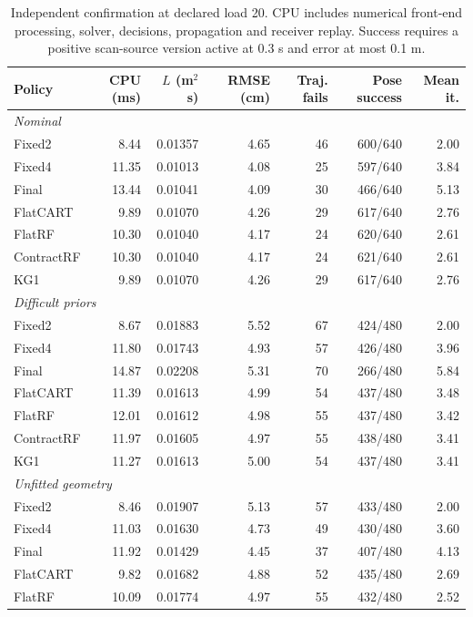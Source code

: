 \begin{table}[!htbp]\centering\footnotesize
\caption{Independent confirmation at declared load 20. CPU includes numerical front-end processing, solver, decisions, propagation and receiver replay. Success requires a positive scan-source version active at 0.3 s and error at most 0.1 m.}\label{tab:confirmation}
\begin{tabular}{@{}lrrrrrr@{}}\toprule
Policy & CPU (ms) & $L$ (m$^2$s) & RMSE (cm) & Traj. fails & Pose success & Mean it.\\\midrule
\multicolumn{7}{l}{\textit{Nominal}}\\
Fixed2 & 8.44 & 0.01357 & 4.65 & 46 & 600/640 & 2.00\\
Fixed4 & 11.35 & 0.01013 & 4.08 & 25 & 597/640 & 3.84\\
Final & 13.44 & 0.01041 & 4.09 & 30 & 466/640 & 5.13\\
FlatCART & 9.89 & 0.01070 & 4.26 & 29 & 617/640 & 2.76\\
FlatRF & 10.30 & 0.01040 & 4.17 & 24 & 620/640 & 2.61\\
ContractRF & 10.30 & 0.01040 & 4.17 & 24 & 621/640 & 2.61\\
KG1 & 9.89 & 0.01070 & 4.26 & 29 & 617/640 & 2.76\\
\multicolumn{7}{l}{\textit{Difficult priors}}\\
Fixed2 & 8.67 & 0.01883 & 5.52 & 67 & 424/480 & 2.00\\
Fixed4 & 11.80 & 0.01743 & 4.93 & 57 & 426/480 & 3.96\\
Final & 14.87 & 0.02208 & 5.31 & 70 & 266/480 & 5.84\\
FlatCART & 11.39 & 0.01613 & 4.99 & 54 & 437/480 & 3.48\\
FlatRF & 12.01 & 0.01612 & 4.98 & 55 & 437/480 & 3.42\\
ContractRF & 11.97 & 0.01605 & 4.97 & 55 & 438/480 & 3.41\\
KG1 & 11.27 & 0.01613 & 5.00 & 54 & 437/480 & 3.41\\
\multicolumn{7}{l}{\textit{Unfitted geometry}}\\
Fixed2 & 8.46 & 0.01907 & 5.13 & 57 & 433/480 & 2.00\\
Fixed4 & 11.03 & 0.01630 & 4.73 & 49 & 430/480 & 3.60\\
Final & 11.92 & 0.01429 & 4.45 & 37 & 407/480 & 4.13\\
FlatCART & 9.82 & 0.01682 & 4.88 & 52 & 435/480 & 2.69\\
FlatRF & 10.09 & 0.01774 & 4.97 & 55 & 432/480 & 2.52\\

\end{tabular}
\end{table}
